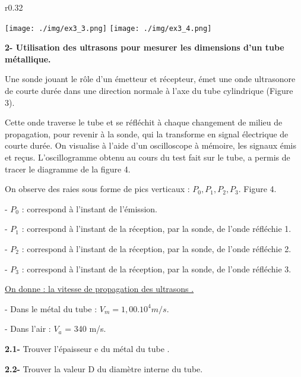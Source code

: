 \documentclass[12pt, french]{article}
\begin{document}
\begin{wrapfigure}{r}{0.32\textwidth}
  \begin{center}
	  \vspace{-0.6cm}
	\texttt{[image: ./img/ex3\_3.png]}
	\texttt{[image: ./img/ex3\_4.png]}
  \end{center}
\end{wrapfigure}


\textbf{2- Utilisation des ultrasons pour mesurer les dimensions d’un tube métallique.}

Une sonde jouant le rôle d’un émetteur et récepteur, émet une
onde ultrasonore de courte durée dans une direction normale
à l’axe du tube cylindrique (Figure 3).

Cette onde traverse le tube et se réfléchit à chaque
changement de milieu de propagation, pour revenir à la
sonde, qui la transforme en signal électrique de courte durée.
On visualise à l’aide d’un oscilloscope à mémoire, les
signaux émis et reçus. L’oscillogramme obtenu au cours du
test fait sur le tube, a permis de tracer le diagramme de la
figure 4.

On observe des raies sous forme de pics verticaux : $P_0, P_1, P_2, P_3$. Figure 4.

- $P_0$ : correspond à l’instant de l’émission.

- $P_1$ : correspond à l’instant de la réception, par la sonde, de l’onde réfléchie 1.

- $P_2$ : correspond à l’instant de la réception, par la sonde, de l’onde réfléchie 2.

- $P_3$ : correspond à l’instant de la réception, par la sonde, de l’onde réfléchie 3. 

\underline{On donne : la vitesse de propagation des ultrasons .}

- Dans le métal du tube : $V_m = 1,00.10^4 m/s$.

- Dans l’air : $V_a$ = 340 m/s.

\textbf{2.1- }Trouver l’épaisseur e du métal du tube .

\textbf{2.2- }Trouver la valeur D du diamètre interne du tube.
\end{document}
